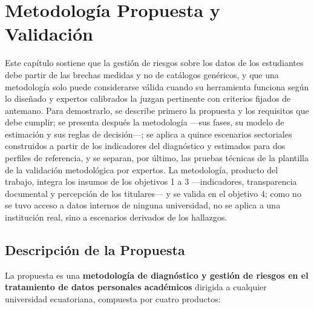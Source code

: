 \chapter{Metodología Propuesta y Validación}
\label{chap:propuesta}

Este capítulo sostiene que la gestión de riesgos sobre los datos de los estudiantes debe partir de las brechas medidas y no de catálogos genéricos, y que una metodología solo puede considerarse válida cuando su herramienta funciona según lo diseñado y expertos calibrados la juzgan pertinente con criterios fijados de antemano. Para demostrarlo, se describe primero la propuesta y los requisitos que debe cumplir; se presenta después la metodología ---sus fases, su modelo de estimación y sus reglas de decisión---; se aplica a quince escenarios sectoriales construidos a partir de los indicadores del diagnóstico y estimados para dos perfiles de referencia, y se separan, por último, las pruebas técnicas de la plantilla de la validación metodológica por expertos. La metodología, producto del trabajo, integra los insumos de los objetivos 1 a 3 ---indicadores, transparencia documental y percepción de los titulares--- y se valida en el objetivo 4; como no se tuvo acceso a datos internos de ninguna universidad, no se aplica a una institución real, sino a escenarios derivados de los hallazgos.

\section{Descripción de la Propuesta}
\label{sec:descripcion_propuesta}

La propuesta es una \textbf{metodología de diagnóstico y gestión de riesgos en el tratamiento de datos personales académicos} dirigida a cualquier universidad ecuatoriana, compuesta por cuatro productos:

